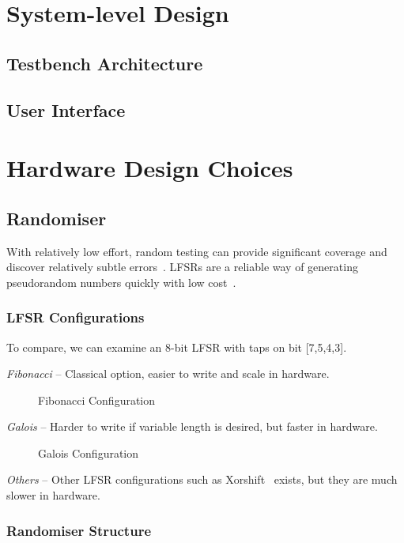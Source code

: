 \section{System-level Design}

\subsection{Testbench Architecture}
\subsection{User Interface}

\section{Hardware Design Choices}


\subsection{Randomiser}
With relatively low effort, random testing can provide significant coverage and discover relatively subtle errors~\cite{Duran1}.
LFSRs are a reliable way of generating pseudorandom numbers quickly with low cost~\cite{Hazwani1}.
\subsubsection{LFSR Configurations}

To compare, we can examine an 8-bit LFSR with taps on bit [7,5,4,3].

\textit{Fibonacci} --
Classical option, easier to write and scale in hardware.

\begin{figure}[ht]
  \centering
  
  \caption{Fibonacci Configuration}
  \label{FibLFSR}
\end{figure}

\textit{Galois} --
Harder to write if variable length is desired, but faster in hardware.

\begin{figure}[ht]
  \centering
  
  \caption{Galois Configuration}
  \label{GalLFSR}
\end{figure}

\textit{Others} --
Other LFSR configurations such as Xorshift~\cite{Marsaglia1} exists, but they are much slower in hardware.

\subsubsection{Randomiser Structure}

